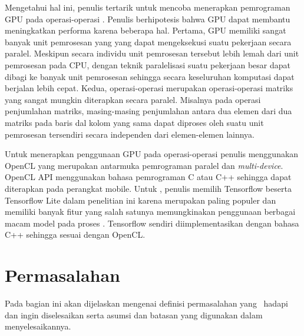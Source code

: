 Mengetahui hal ini, penulis tertarik untuk mencoba menerapkan pemrograman GPU pada operasi-operasi \deeplearning \inference. Penulis berhipotesis bahwa GPU dapat membantu meningkatkan performa karena beberapa hal. Pertama, GPU memiliki sangat banyak unit pemrosesan yang yang dapat mengeksekusi suatu pekerjaan secara paralel. Meskipun secara individu unit pemrosesan tersebut lebih lemah dari unit pemrosesan pada CPU, dengan teknik paralelisasi suatu pekerjaan besar dapat dibagi ke banyak unit pemrosesan sehingga secara keseluruhan komputasi dapat berjalan lebih cepat. Kedua, operasi-operasi \deeplearning \inference merupakan operasi-operasi matriks yang sangat mungkin diterapkan secara paralel. Misalnya pada operasi penjumlahan matriks, masing-masing penjumlahan antara dua elemen dari dua matriks pada baris dal kolom yang sama dapat diproses oleh suatu unit pemrosesan tersendiri secara independen dari elemen-elemen lainnya.

Untuk menerapkan penggunaan GPU pada operasi-operasi \deeplearning \inference penulis menggunakan OpenCL yang merupakan antarmuka pemrograman paralel dan \textit{multi-device}. OpenCL API menggunakan bahasa pemrograman C atau C++ sehingga dapat diterapkan pada perangkat mobile. Untuk \framework \deeplearning, penulis memilih Tensorflow beserta Tensorflow Lite dalam penelitian ini karena merupakan \framework \deeplearning paling populer dan memiliki banyak fitur yang salah satunya memungkinakan penggunaan berbagai macam model \nn pada proses \inference. Tensorflow sendiri diimplementasikan dengan bahasa C++ sehingga sesuai dengan OpenCL.

\section{Permasalahan}
Pada bagian ini akan dijelaskan mengenai definisi permasalahan 
yang \saya~hadapi dan ingin diselesaikan serta asumsi dan batasan 
yang digunakan dalam menyelesaikannya.


